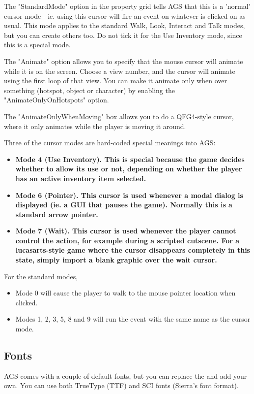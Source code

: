 The "StandardMode" option in the property grid tells AGS that this is a 'normal' cursor mode - ie.
using this cursor will fire an event on whatever is clicked on as usual. This
mode applies to the standard Walk, Look, Interact and Talk modes, but you can create
others too. Do not tick it for the Use Inventory mode, since this is a special mode.

The "Animate" option allows you to specify that the mouse cursor will animate while it
is on the screen. Choose a view number, and the cursor will animate using the first
loop of that view. You can make it animate only when over something (hotspot, object
or character) by enabling the "AnimateOnlyOnHotspots" option.

The "AnimateOnlyWhenMoving" box allows you to do a QFG4-style cursor, where it only
animates while the player is moving it around.

Three of the cursor modes are hard-coded special meanings into AGS:
\begin{itemize}
\item \bf{Mode 4 (Use Inventory)}. This is special because the game decides whether to
allow its use or not, depending on whether the player has an active inventory item
selected.
\item \bf{Mode 6 (Pointer)}. This cursor is used whenever a modal dialog is displayed
(ie. a GUI that pauses the game). Normally this is a standard arrow pointer.
\item \bf{Mode 7 (Wait)}. This cursor is used whenever the player cannot control the
action, for example during a scripted cutscene. For a lucasarts-style game where the cursor
disappears completely in this state, simply import a blank graphic over the wait cursor.
\end{itemize}

For the standard modes,
\begin{itemize}
\item Mode 0 will cause the player to walk to the mouse pointer location when clicked.
\item Modes 1, 2, 3, 5, 8 and 9 will run the event with the same name as the cursor mode.
\end{itemize}


\subsection{Fonts}%

AGS comes with a couple of default fonts, but you can replace the and add your own.
You can use both TrueType (TTF) and SCI fonts (Sierra's font format).

